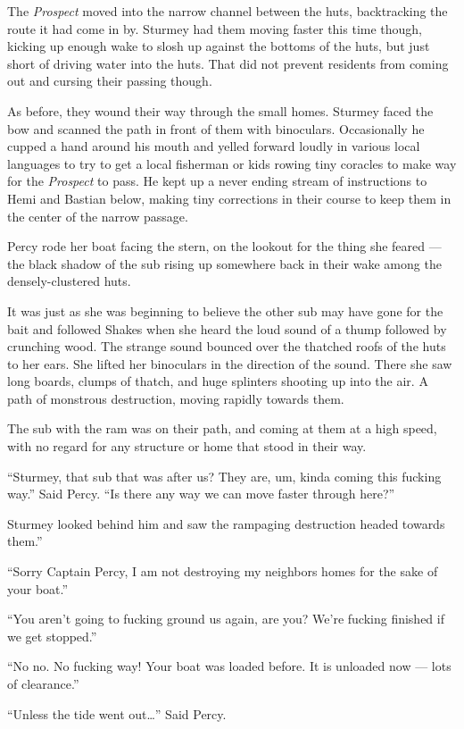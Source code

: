 \documentclass[
]{scrbook}
\begin{document}
The \emph{Prospect} moved into the narrow channel between the huts,
backtracking the route it had come in by. Sturmey had them moving faster
this time though, kicking up enough wake to slosh up against the bottoms
of the huts, but just short of driving water into the huts. That did not
prevent residents from coming out and cursing their passing though.

As before, they wound their way through the small homes. Sturmey faced
the bow and scanned the path in front of them with binoculars.
Occasionally he cupped a hand around his mouth and yelled forward loudly
in various local languages to try to get a local fisherman or kids
rowing tiny coracles to make way for the \emph{Prospect} to pass. He
kept up a never ending stream of instructions to Hemi and Bastian below,
making tiny corrections in their course to keep them in the center of
the narrow passage.

Percy rode her boat facing the stern, on the lookout for the thing she
feared --- the black shadow of the sub rising up somewhere back in their
wake among the densely-clustered huts.

It was just as she was beginning to believe the other sub may have gone
for the bait and followed Shakes when she heard the loud sound of a
thump followed by crunching wood. The strange sound bounced over the
thatched roofs of the huts to her ears. She lifted her binoculars in the
direction of the sound. There she saw long boards, clumps of thatch, and
huge splinters shooting up into the air. A path of monstrous
destruction, moving rapidly towards them.

The sub with the ram was on their path, and coming at them at a high
speed, with no regard for any structure or home that stood in their way.

``Sturmey, that sub that was after us? They are, um, kinda coming this
fucking way.'' Said Percy. ``Is there any way we can move faster through
here?''

Sturmey looked behind him and saw the rampaging destruction headed
towards them.''

``Sorry Captain Percy, I am not destroying my neighbors homes for the
sake of your boat.''

``You aren't going to fucking ground us again, are you? We're fucking
finished if we get stopped.''

``No no. No fucking way! Your boat was loaded before. It is unloaded now
--- lots of clearance.''

``Unless the tide went out\ldots{}'' Said Percy.
\end{document}
